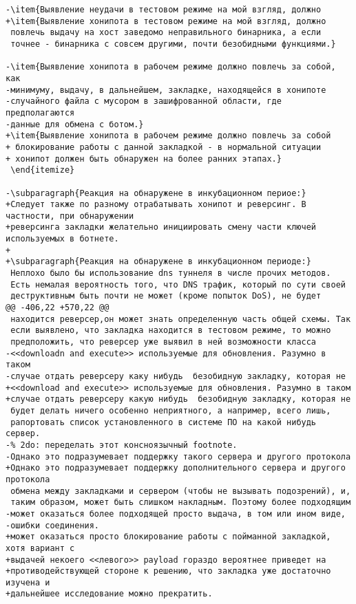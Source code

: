 \begin{verbatim}
-\item{Выявление неудачи в тестовом режиме на мой взгляд, должно
+\item{Выявление хонипота в тестовом режиме на мой взгляд, должно
 повлечь выдачу на хост заведомо неправильного бинарника, а если
 точнее - бинарника с совсем другими, почти безобидными функциями.}

-\item{Выявление хонипота в рабочем режиме должно повлечь за собой, как
-минимуму, выдачу, в дальнейшем, закладке, находящейся в хонипоте
-случайного файла с мусором в зашифрованной области, где предполагаются
-данные для обмена с ботом.}
+\item{Выявление хонипота в рабочем режиме должно повлечь за собой
+ блокирование работы с данной закладкой - в нормальной ситуации
+ хонипот должен быть обнаружен на более ранних этапах.}
 \end{itemize}

-\subparagraph{Реакция на обнаружене в инкубационном периое:}
+Следует также по разному отрабатывать хонипот и реверсинг. В частности, при обнаружении
+реверсинга закладки желательно инициировать смену части ключей используемых в ботнете.
+
+\subparagraph{Реакция на обнаружене в инкубационном периоде:}
 Неплохо было бы использование dns туннеля в числе прочих методов.
 Есть немалая вероятность того, что DNS трафик, который по сути своей
 деструктивным быть почти не может (кроме попыток DoS), не будет
@@ -406,22 +570,22 @@
 находится реверсер,он может знать определенную часть общей схемы. Так
 если выявлено, что закладка находится в тестовом режиме, то можно
 предположить, что реверсер уже выявил в ней возможности класса
-<<downloadn and execute>> используемые для обновления. Разумно в таком
-случае отдать реверсеру каку нибудь  безобидную закладку, которая не
+<<download and execute>> используемые для обновления. Разумно в таком
+случае отдать реверсеру какую нибудь  безобидную закладку, которая не
 будет делать ничего особенно неприятного, а например, всего лишь,
 рапортовать список установленного в системе ПО на какой нибудь сервер.
-% 2do: переделать этот консноязычный footnote.
-Однако это подразумевает поддержку такого сервера и другого протокола
+Однако это подразумевает поддержку дополнительного сервера и другого протокола
 обмена между закладками и сервером (чтобы не вызывать подозрений), и,
 таким образом, может быть слишком накладным. Поэтому более подходящим
-может оказаться более подходящей просто выдача, в том или ином виде,
-ошибки соединения.
+может оказаться просто блокирование работы с пойманной закладкой, хотя вариант с
+выдачей некоего <<левого>> payload гораздо вероятнее приведет на
+противодействующей стороне к решению, что закладка уже достаточно изучена и
+дальнейшее исследование можно прекратить.


\end{verbatim}
